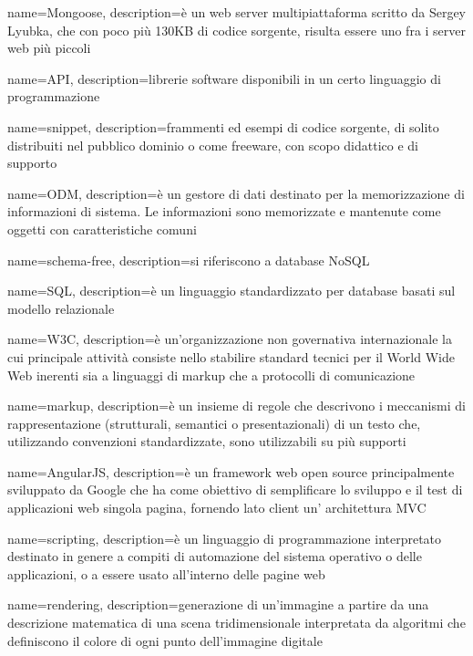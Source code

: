  {
	name=Mongoose,
	description={è un web server multipiattaforma scritto da Sergey Lyubka, che con poco più 130KB di codice sorgente, risulta essere uno fra i server web più piccoli}
}

 {
	name=API,
	description={librerie software disponibili in un certo linguaggio di programmazione}
}

 {
	name=snippet,
	description={frammenti ed esempi di codice sorgente, di solito distribuiti nel pubblico dominio o come freeware, con scopo didattico e di supporto}
}

 {
	name=ODM,
	description={è un gestore di dati destinato per la memorizzazione di informazioni di sistema. Le informazioni sono memorizzate e mantenute come oggetti con caratteristiche comuni}
}

 {
	name=schema-free,
	description={si riferiscono a database NoSQL}
}

 {
	name=SQL,
	description={è un linguaggio standardizzato per database basati sul modello relazionale }
}

 {
	name=W3C,
	description={è un'organizzazione non governativa internazionale la cui principale attività  consiste nello stabilire standard tecnici per il World Wide Web inerenti sia a linguaggi di markup che a protocolli di comunicazione}
}

 {
	name=markup,
	description={è un insieme di regole che descrivono i meccanismi di rappresentazione (strutturali, semantici o presentazionali) di un testo che, utilizzando convenzioni standardizzate, sono utilizzabili su più supporti}
}

 {
	name=AngularJS,
	description={è un framework web open source principalmente sviluppato da Google che ha come obiettivo di semplificare lo sviluppo e il test di applicazioni web singola pagina, fornendo lato client un' architettura MVC}
}

 {
	name=scripting,
	description={è un linguaggio di programmazione interpretato destinato in genere a compiti di automazione del sistema operativo o delle applicazioni, o a essere usato all'interno delle pagine web}
}

 {
	name=rendering,
	description={generazione di un'immagine a partire da una descrizione matematica di una scena tridimensionale interpretata da algoritmi che definiscono il colore di ogni punto dell'immagine digitale}
}

